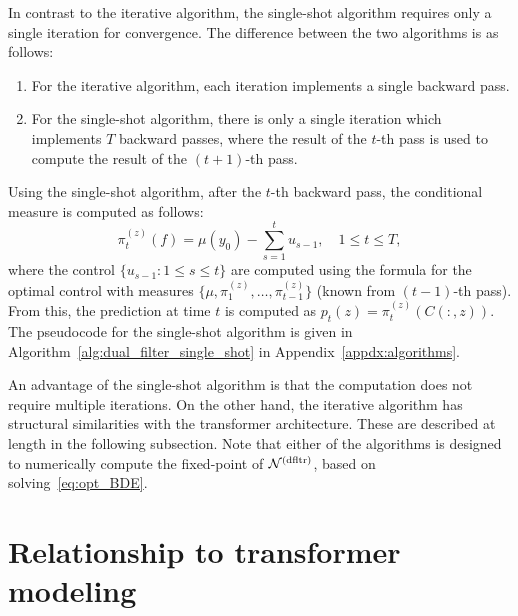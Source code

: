 \documentclass[twoside,11pt]{article}
\newcommand{\comment}[1]{{\color{blue}#1}}
\newcommand{\newP}[1]{\medskip\noindent{\bf #1:}}
\def\clN{{\cal N}}
\def\dfltr{{\text{\rm (dfltr)}}}
\begin{document}
% 



\newP{2. Single-shot algorithm}  In
contrast to the iterative algorithm, the single-shot algorithm
requires only a single iteration for convergence.  The difference between
the two algorithms is as follows:
\begin{enumerate}
\item For the iterative algorithm, each iteration implements a single
  backward pass.
\item For the single-shot algorithm, there is only a single iteration
  which implements
  $T$ backward passes, where the result of the $t$-th pass is used to
  compute the result of the $(t+1)$-th pass. 
\end{enumerate}
Using the single-shot algorithm, after the $t$-th backward pass, the
conditional measure is computed as follows:
\begin{equation*}
 \pi_t^{({z})}(f)=\mu(y_0) - \sum_{s=1}^{t}u_{s-1},\quad 1\leq t\leq T,
\end{equation*}
where the control $\{u_{s-1}:1\leq s\leq t\}$ are computed using the
formula for the optimal control with measures $\{\mu,\pi_1^{({z})},
\hdots,\pi_{t-1}^{({z})}\}$ (known from $(t-1)$-th pass). 
From this, the prediction at time $t$ is computed as $p_t(z) =
\pi_t^{({z})} (C(:,z))$. 
The pseudocode for the single-shot algorithm is given in 
Algorithm~\ref{alg:dual_filter_single_shot} in Appendix~\ref{appdx:algorithms}.



An advantage of the single-shot algorithm is that the computation does not require multiple
iterations. On the other hand, the iterative algorithm has structural
similarities with the transformer architecture.  These are described
at length in the following subsection.  Note that either of the
algorithms is designed to numerically compute the fixed-point of
$\clN^\dfltr$, based on solving~\eqref{eq:opt_BDE}.



\section{Relationship to transformer modeling}
\label{sec:xformer}
\end{document}
